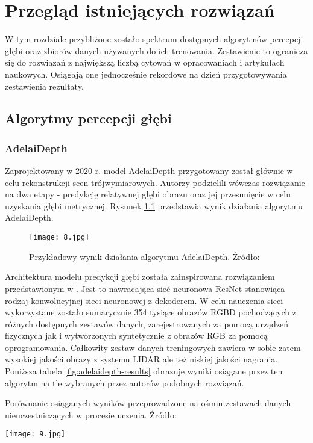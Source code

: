 \chapter{Przegląd istniejących rozwiązań}\label{chap:3_przegląd_istniejących_rozwiązań}

W tym rozdziale przybliżone zostało spektrum dostępnych algorytmów percepcji głębi oraz zbiorów danych używanych do ich trenowania. Zestawienie to ogranicza się do rozwiązań z największą liczbą cytowań w opracowaniach i artykułach naukowych. Osiągają one jednocześnie rekordowe na dzień przygotowywania zestawienia rezultaty.

\section{Algorytmy percepcji głębi}
\subsection{AdelaiDepth}
Zaprojektowany w 2020 r. model AdelaiDepth \cite{yin2020} przygotowany został głównie w celu rekonstrukcji scen trójwymiarowych. Autorzy podzielili wówczas rozwiązanie na dwa etapy - predykcję relatywnej głębi obrazu oraz jej przesunięcie w celu uzyskania głębi metrycznej. Rysunek \ref{fig:adelaidepth} przedstawia wynik działania algorytmu AdelaiDepth.
\begin{figure}[H]
    \centering
    \texttt{[image: 8.jpg]}
    \caption{Przykładowy wynik działania algorytmu AdelaiDepth. Źródło: \cite{yin2020}}
    \label{fig:adelaidepth}
\end{figure}
Architektura modelu predykcji głębi została zainspirowana rozwiązaniem przedstawionym w \cite{xian2020}. Jest to nawracająca sieć neuronowa ResNet \cite{he2015} stanowiąca rodzaj konwolucyjnej sieci neuronowej z dekoderem. W celu nauczenia sieci wykorzystane zostało sumarycznie 354 tysiące obrazów RGBD pochodzących z różnych dostępnych zestawów danych, zarejestrowanych za pomocą urządzeń fizycznych jak i wytworzonych syntetycznie z obrazów RGB za pomocą oprogramowania. Całkowity zestaw danych treningowych zawiera w sobie zatem  wysokiej jakości obrazy z systemu LIDAR ale też niskiej jakości nagrania. Poniższa tabela \ref{fig:adelaidepth-results} obrazuje wyniki osiągane przez ten algorytm na tle wybranych przez autorów podobnych rozwiązań.
\begin{table}[H]
    \centering
    \caption{Porównanie osiąganych wyników przeprowadzone na ośmiu zestawach danych nieuczestniczących w procesie uczenia. Źródło: \cite{yin2020}}
    \texttt{[image: 9.jpg]}
    \label{fig:adelaidepth-results}
\end{table}

